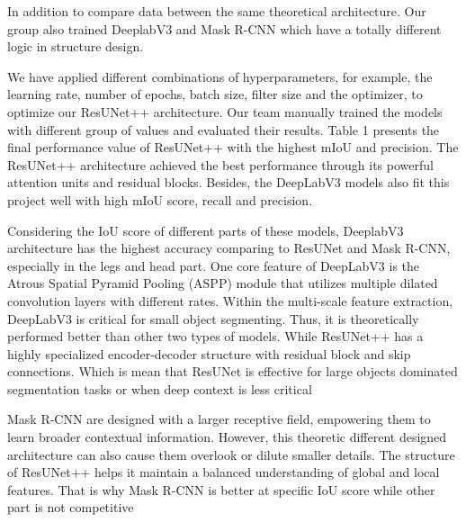 \documentclass[conference]{IEEEtran}
\begin{document}
In addition to compare data between the same theoretical architecture. Our group also trained DeeplabV3 and Mask R-CNN which have a totally different logic in structure design.

We have applied different combinations of hyperparameters, for example, the learning rate, number of epochs, batch size, filter size and the optimizer, to optimize our ResUNet++ architecture. Our team manually trained the models with different group of values and evaluated their results. Table 1 presents the final performance value of ResUNet++ with the highest mIoU and precision. The ResUNet++ architecture achieved the best performance through its powerful attention units and residual blocks. Besides, the DeepLabV3 models also fit this project well with high mIoU score, recall and precision.

Considering the IoU score of different parts of these models, DeeplabV3 architecture has the highest accuracy comparing to ResUNet and Mask R-CNN, especially in the legs and head part. One core feature of DeepLabV3 is the Atrous Spatial Pyramid Pooling (ASPP) module that utilizes multiple dilated convolution layers with different rates. Within the multi-scale feature extraction, DeepLabV3 is critical for small object segmenting. Thus, it is theoretically performed better than other two types of models. While ResUNet++ has a highly specialized encoder-decoder structure with residual block and skip connections. Which is mean that ResUNet is effective for large objects dominated segmentation tasks or when deep context is less critical

Mask R-CNN are designed with a larger receptive field, empowering them to learn broader contextual information. However, this theoretic different designed architecture can also cause them overlook or dilute smaller details. The structure of ResUNet++ helps it maintain a balanced understanding of global and local features. That is why Mask R-CNN is better at specific IoU score while other part is not competitive 
\end{document}
